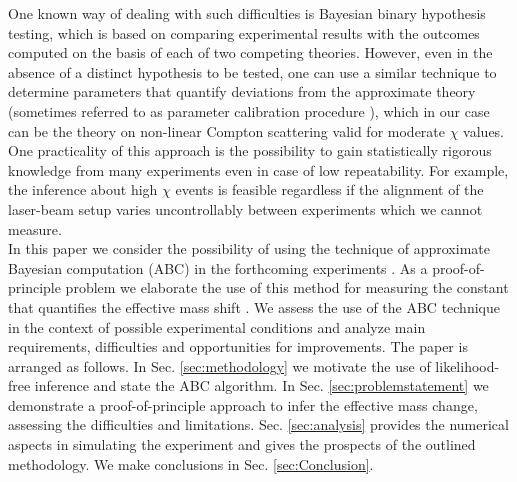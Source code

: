 \documentclass[%
 reprint,
 amsmath,amssymb,
 aps,
]{revtex4-2}
\newcommand{\Cedit}[1]{{\color{cyan}#1}}
\begin{document}
One known way of dealing with such difficulties is Bayesian binary hypothesis testing, which is based on comparing experimental results with the outcomes computed on the basis of each of two competing theories. However, even in the absence of a distinct hypothesis to be tested, one can use a similar technique to determine parameters that quantify deviations from the approximate theory (sometimes referred to as parameter calibration procedure \cite{ritto2022reinforcement,kennedy2001bayesian,dejong1996bayesian}), which in our case can be the theory on non-linear Compton scattering valid for moderate $\chi$ values. One practicality of this approach is the possibility to gain statistically rigorous knowledge from many experiments even in case of low repeatability. For example, the inference about high $\chi$ events is feasible regardless if the alignment of the laser-beam setup varies uncontrollably between experiments which we cannot measure. \\

In this paper we consider the possibility of using the technique of approximate Bayesian computation (ABC) in the forthcoming experiments \cite{brehmer2020mining,akeret2015approximate,ritto2022reinforcement}. As a proof-of-principle problem we elaborate the use of this method for measuring the constant that quantifies the effective mass shift \cite{fedotov2022advances,yakimenko2019prospect,ritus1970radiative,meuren2011quantum}. We assess the use of the ABC technique in the context of possible experimental conditions and analyze main requirements, difficulties and opportunities for improvements. The paper is arranged as follows. In Sec. \ref{sec:methodology} we motivate the use of likelihood-free inference and state the ABC algorithm. In Sec. \ref{sec:problemstatement} we demonstrate a proof-of-principle approach to infer the effective mass change, assessing the difficulties and limitations. Sec. \ref{sec:analysis} provides the numerical aspects in simulating the experiment and gives the prospects of the outlined methodology. We make conclusions in Sec. \ref{sec:Conclusion}.
\end{document}
